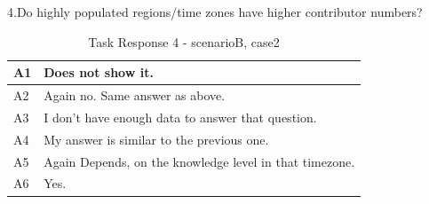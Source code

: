 \documentclass[seploa]{beavtex}
\begin{document}
\begin{appendices}
4.Do highly populated regions/time zones have higher contributor numbers?

\begin{table}[H]
\begin{tabular}{ |p{2cm}|p{12cm}| }
 \hline
 A1 & Does not show it.\\
 \hline
 A2 & Again no. Same answer as above.
\\ \hline
 A3 & I don't have enough data to answer that question.\\ \hline
 A4 & My answer is similar to the previous one.\\ \hline
 A5 & Again Depends, on the knowledge level in that timezone.\\ \hline
 A6 & Yes.\\
 \hline
\end{tabular}
\caption{Task Response 4 - scenarioB, case2}
\label{tab:table34}
\end{table}

\end{appendices}
\end{document}

